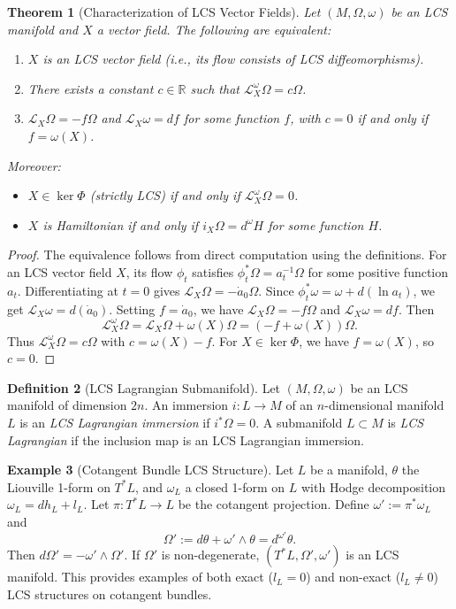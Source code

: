 \documentclass[11pt,a4paper]{amsart}
\newtheorem{theorem}{Theorem}[section]
\theoremstyle{definition}
\newtheorem{definition}[theorem]{Definition}
\newtheorem{example}[theorem]{Example}
\theoremstyle{remark}
\newcommand{\Lomega}{\mathcal{L}^\omega}
\newcommand{\domega}{d^\omega}
\begin{document}
	\begin{theorem}[Characterization of LCS Vector Fields]
		Let $(M, \Omega, \omega)$ be an LCS manifold and $X$ a vector field. The following are equivalent:
		\begin{enumerate}
			\item $X$ is an LCS vector field (i.e., its flow consists of LCS diffeomorphisms).
			\item There exists a constant $c \in \mathbb{R}$ such that $\Lomega_X \Omega = c\Omega$.
			\item $\mathcal{L}_X \Omega = -f\Omega$ and $\mathcal{L}_X \omega = df$ for some function $f$, with $c = 0$ if and only if $f = \omega(X)$.
		\end{enumerate}
		Moreover:
		\begin{itemize}
			\item $X \in \ker \Phi$ (strictly LCS) if and only if $\Lomega_X \Omega = 0$.
			\item $X$ is Hamiltonian if and only if $i_X \Omega = \domega H$ for some function $H$.
		\end{itemize}
	\end{theorem}
	
	\begin{proof}
		The equivalence follows from direct computation using the definitions. For an LCS vector field $X$, its flow $\phi_t$ satisfies $\phi_t^*\Omega = a_t^{-1}\Omega$ for some positive function $a_t$. Differentiating at $t=0$ gives $\mathcal{L}_X \Omega = -\dot{a}_0 \Omega$. Since $\phi_t^*\omega = \omega + d(\ln a_t)$, we get $\mathcal{L}_X \omega = d(\dot{a}_0)$. Setting $f = \dot{a}_0$, we have $\mathcal{L}_X \Omega = -f\Omega$ and $\mathcal{L}_X \omega = df$. Then
		\[
		\Lomega_X \Omega = \mathcal{L}_X \Omega + \omega(X)\Omega = (-f + \omega(X))\Omega.
		\]
		Thus $\Lomega_X \Omega = c\Omega$ with $c = \omega(X) - f$. For $X \in \ker \Phi$, we have $f = \omega(X)$, so $c = 0$.
	\end{proof}
	
	\begin{definition}[LCS Lagrangian Submanifold]
		Let $(M, \Omega, \omega)$ be an LCS manifold of dimension $2n$. An immersion $i: L \to M$ of an $n$-dimensional manifold $L$ is an \emph{LCS Lagrangian immersion} if $i^*\Omega = 0$. A submanifold $L \subset M$ is \emph{LCS Lagrangian} if the inclusion map is an LCS Lagrangian immersion.
	\end{definition}
	
	\begin{example}[Cotangent Bundle LCS Structure] \label{ex:cotangent}
		Let $L$ be a manifold, $\theta$ the Liouville 1-form on $T^*L$, and $\omega_L$ a closed 1-form on $L$ with Hodge decomposition $\omega_L = dh_L + l_L$. Let $\pi : T^*L \to L$ be the cotangent projection. Define $\omega' := \pi^*\omega_L$ and
		\[
		\Omega' := d\theta + \omega' \wedge \theta = d^{\omega'} \theta.
		\]
		Then $d\Omega' = -\omega' \wedge \Omega'$. If $\Omega'$ is non-degenerate, $(T^*L, \Omega', \omega')$ is an LCS manifold. This provides examples of both exact ($l_L=0$) and non-exact ($l_L\neq 0$) LCS structures on cotangent bundles.
	\end{example}
	
\end{document}
